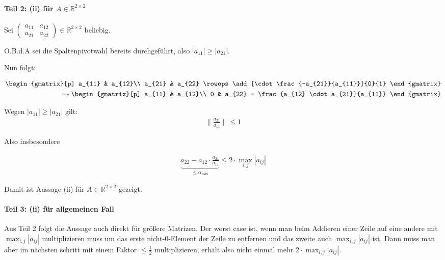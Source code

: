\paragraph{Teil 2: (ii) für $A \in \mathbb{R}^{2 \times 2}$}
Sei $\begin{pmatrix}a_{11} & a_{12}\\a_{21} & a_{22} \end{pmatrix} \in \mathbb{R}^{2 \times 2}$
beliebig. 

O.B.d.A sei die Spaltenpivotwahl bereits durchgeführt, also $|a_{11}| \geq |a_{21}|$.

Nun folgt:

\begin{align}
    \begin{gmatrix}[p]
        a_{11} & a_{12}\\
        a_{21} & a_{22}
        \rowops
        \add[\cdot \frac{-a_{21}}{a_{11}}]{0}{1}
    \end{gmatrix}\\
    \leadsto
    \begin{gmatrix}[p]
        a_{11} & a_{12}\\
        0      & a_{22} - \frac{a_{12} \cdot a_{21}}{a_{11}}
    \end{gmatrix}
\end{align}

Wegen $|a_{11}| \geq |a_{21}|$ gilt: 
\begin{align}
    \|\frac{a_{21}}{a_{11}}\| \leq 1
\end{align}

Also insbesondere

\begin{align}
    \underbrace{a_{22} - a_{12} \cdot \frac{a_{21}}{a_{11}}}_{\leq \alpha_\text{max}} \leq 2 \cdot \max_{i,j}|a_{ij}|
\end{align}

Damit ist Aussage (ii) für $A \in \mathbb{R}^{2 \times 2}$ gezeigt.

\paragraph{Teil 3: (ii) für allgemeinen Fall}

Aus Teil 2 folgt die Aussage auch direkt für größere Matrizen.
Der worst case ist, wenn man beim Addieren einer Zeile auf eine 
andere mit $\max_{i,j}|a_{ij}|$ multiplizieren muss um das erste nicht-0-Element
der Zeile zu entfernen und das zweite auch $\max_{i,j}|a_{ij}|$ ist.
Dann muss man aber im nächsten schritt mit einem Faktor $\leq \frac{1}{2}$
multiplizieren, erhält also nicht einmal mehr $2 \cdot \max_{i,j}|a_{ij}|$.
